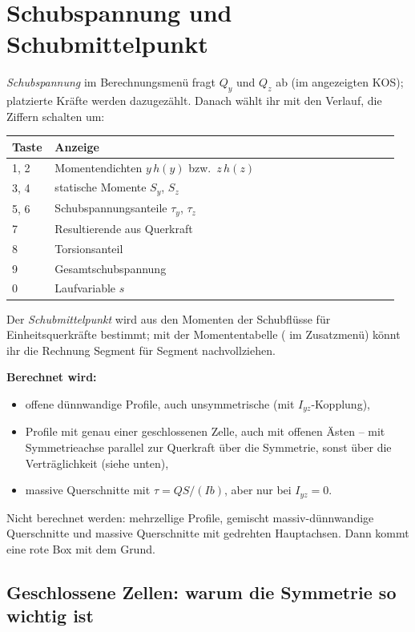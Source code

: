 \section{Schubspannung und Schubmittelpunkt}

\emph{Schubspannung} im Berechnungsmenü fragt $Q_y$ und $Q_z$ ab (im angezeigten KOS); platzierte
Kräfte werden dazugezählt. Danach wählt ihr mit  den Verlauf, die Ziffern schalten um:

\begin{longtable}{p{0.10\linewidth}p{0.86\linewidth}}
  \toprule
  \textbf{Taste} & \textbf{Anzeige} \\
  \midrule \endhead
  1, 2 & Momentendichten $y\,h(y)$ bzw.\ $z\,h(z)$ \\
  3, 4 & statische Momente $S_y$, $S_z$ \\
  5, 6 & Schubspannungsanteile $\tau_y$, $\tau_z$ \\
  7 & Resultierende aus Querkraft \\
  8 & Torsionsanteil \\
  9 & Gesamtschubspannung \\
  0 & Laufvariable $s$ \\
  \bottomrule
\end{longtable}

Der \emph{Schubmittelpunkt} wird aus den Momenten der Schubflüsse für Einheitsquerkräfte
bestimmt; mit der Momententabelle ( im Zusatzmenü) könnt ihr die Rechnung Segment für
Segment nachvollziehen.

\textbf{Berechnet wird:}

\begin{itemize}
  \item offene dünnwandige Profile, auch unsymmetrische (mit $I_{yz}$-Kopplung),
  \item Profile mit genau einer geschlossenen Zelle, auch mit offenen Ästen -- mit Symmetrieachse
        parallel zur Querkraft über die Symmetrie, sonst über die Verträglichkeit (siehe unten),
  \item massive Querschnitte mit $\tau = QS/(Ib)$, aber nur bei $I_{yz} = 0$.
\end{itemize}

Nicht berechnet werden: mehrzellige Profile, gemischt massiv-dünnwandige Querschnitte und massive
Querschnitte mit gedrehten Hauptachsen. Dann kommt eine rote Box mit dem Grund.

\subsection{Geschlossene Zellen: warum die Symmetrie so wichtig ist}


